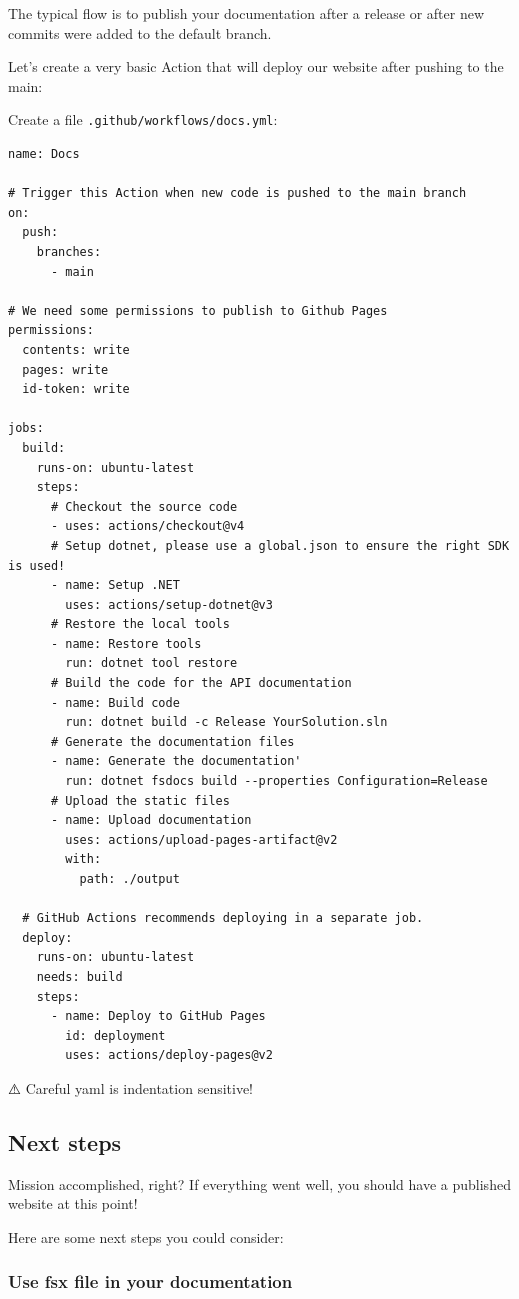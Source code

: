 \documentclass{article}
\begin{document}
The typical flow is to publish your documentation after a release or after new commits were added to the default branch.

Let's create a very basic Action that will deploy our website after pushing to the main:


Create a file \texttt{.github/workflows/docs.yml}:
\begin{lstlisting}
name: Docs

# Trigger this Action when new code is pushed to the main branch
on:
  push:
    branches:
      - main

# We need some permissions to publish to Github Pages
permissions:
  contents: write
  pages: write
  id-token: write

jobs:
  build:
    runs-on: ubuntu-latest
    steps:
      # Checkout the source code
      - uses: actions/checkout@v4
      # Setup dotnet, please use a global.json to ensure the right SDK is used!
      - name: Setup .NET
        uses: actions/setup-dotnet@v3
      # Restore the local tools
      - name: Restore tools
        run: dotnet tool restore
      # Build the code for the API documentation
      - name: Build code
        run: dotnet build -c Release YourSolution.sln
      # Generate the documentation files
      - name: Generate the documentation'
        run: dotnet fsdocs build --properties Configuration=Release
      # Upload the static files
      - name: Upload documentation
        uses: actions/upload-pages-artifact@v2
        with:
          path: ./output
  
  # GitHub Actions recommends deploying in a separate job.
  deploy:
    runs-on: ubuntu-latest
    needs: build
    steps:
      - name: Deploy to GitHub Pages
        id: deployment
        uses: actions/deploy-pages@v2

\end{lstlisting}


⚠️ Careful yaml is indentation sensitive!
\subsection*{Next steps}



Mission accomplished, right? If everything went well, you should have a published website at this point!

Here are some next steps you could consider:
\subsubsection*{Use fsx file in your documentation}
\end{document}
